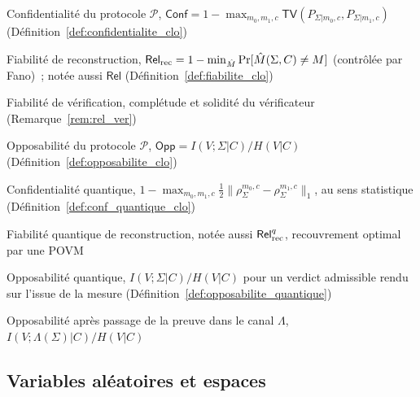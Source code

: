 \begin{sloppypar}
\begin{description}[style=nextline,leftmargin=1.7cm,font=\normalfont\bfseries]
\item[$\mathsf{Conf}(\mathcal{P})$] Confidentialit\'e du protocole $\mathcal{P}$, $\mathsf{Conf} = 1 - \max_{m_0,m_1,c}\mathsf{TV}(P_{\Sigma|m_0,c}, P_{\Sigma|m_1,c})$ (D\'efinition~\ref{def:confidentialite_clo})
\item[$\Relrec(\mathcal{P})$] Fiabilit\'e de reconstruction, $\mathsf{Rel}_{\mathrm{rec}} = 1 - \min_{\hat M}\Pr[\hat{M}(\Sigma,C) \neq M]$ (contr\^ol\'ee par Fano)~; not\'ee aussi $\mathsf{Rel}$ (D\'efinition~\ref{def:fiabilite_clo})
\item[$\Relver(\mathcal{P})$] Fiabilit\'e de v\'erification, compl\'etude et solidit\'e du v\'erificateur (Remarque~\ref{rem:rel_ver})
\item[$\mathsf{Opp}(\mathcal{P})$] Opposabilit\'e du protocole $\mathcal{P}$, $\mathsf{Opp} = I(V;\Sigma|C)/H(V|C)$ (D\'efinition~\ref{def:opposabilite_clo})
\item[$\mathsf{Conf}^q$] Confidentialit\'e quantique, $1 - \max_{m_0,m_1,c} \tfrac12\|\rho_\Sigma^{m_0,c}-\rho_\Sigma^{m_1,c}\|_1$, au sens statistique (D\'efinition~\ref{def:conf_quantique_clo})
\item[$\mathsf{Rel}^q$] Fiabilit\'e quantique de reconstruction, not\'ee aussi $\mathsf{Rel}_{\mathrm{rec}}^q$, recouvrement optimal par une POVM
\item[$\mathsf{Opp}^q$] Opposabilit\'e quantique, $I(V;\Sigma|C)/H(V|C)$ pour un verdict admissible rendu sur l'issue de la mesure (D\'efinition~\ref{def:opposabilite_quantique})
\item[$\mathsf{Opp}^{\Lambda}$] Opposabilit\'e apr\`es passage de la preuve dans le canal $\Lambda$, $I(V;\Lambda(\Sigma)|C)/H(V|C)$
\end{description}

\subsection*{Variables al\'eatoires et espaces}


\end{sloppypar}
